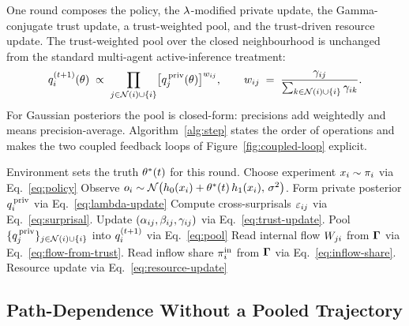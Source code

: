 One round composes the policy, the $\lambda$-modified private update,
the Gamma-conjugate trust update, a trust-weighted pool, and the
trust-driven resource update. The trust-weighted pool over the closed
neighbourhood is unchanged from the standard multi-agent
active-inference treatment:
\begin{equation}
q_i^{(t+1)}(\theta)
\;\propto\;
\prod_{j \in \mathcal{N}(i) \cup \{i\}}
  \bigl[q_j^{\,\mathrm{priv}}(\theta)\bigr]^{w_{ij}},
\qquad
w_{ij}
\;=\;
\frac{\gamma_{ij}}{\sum_{k \in \mathcal{N}(i) \cup \{i\}} \gamma_{ik}}.
\label{eq:pool}
\end{equation}
For Gaussian posteriors the pool is closed-form: precisions add
weightedly and means precision-average. Algorithm~\ref{alg:step}
states the order of operations and makes the two coupled feedback
loops of Figure~\ref{fig:coupled-loop} explicit.

\begin{algorithm}
\caption{One step of the coupled belief--resource model.}
\label{alg:step}
\begin{algorithmic}[1]
\State Environment sets the truth $\theta^{*}(t)$ for this round.
  \State Choose experiment $x_i \sim \pi_i$ via Eq.~\eqref{eq:policy}
  \State Observe $o_i \sim \mathcal{N}\bigl(h_{0}(x_i)
         + \theta^{*}(t)\,h_{1}(x_i),\, \sigma^{2}\bigr)$.
  \State Form private posterior $q_i^{\,\mathrm{priv}}$ via
         Eq.~\eqref{eq:lambda-update}
\EndFor
{}
  \State Compute cross-surprisals $\varepsilon_{ij}$ via
         Eq.~\eqref{eq:surprisal}.
  \State Update $(\alpha_{ij}, \beta_{ij}, \gamma_{ij})$ via
         Eq.~\eqref{eq:trust-update}.
  \State Pool $\{q_j^{\,\mathrm{priv}}\}_{j \in \mathcal{N}(i) \cup \{i\}}$
         into $q_i^{(t+1)}$ via Eq.~\eqref{eq:pool}
\EndFor
{}
  \State Read internal flow $W_{ji}$ from $\boldsymbol{\Gamma}$ via
         Eq.~\eqref{eq:flow-from-trust}.
  \State Read inflow share $\pi^{\mathrm{in}}_{i}$ from $\boldsymbol{\Gamma}$ via
         Eq.~\eqref{eq:inflow-share}.
  \State Resource update via Eq.~\eqref{eq:resource-update}
\EndFor
\end{algorithmic}
\end{algorithm}

\subsection{Path-Dependence Without a Pooled Trajectory}
\label{ssec:path-dependence}

